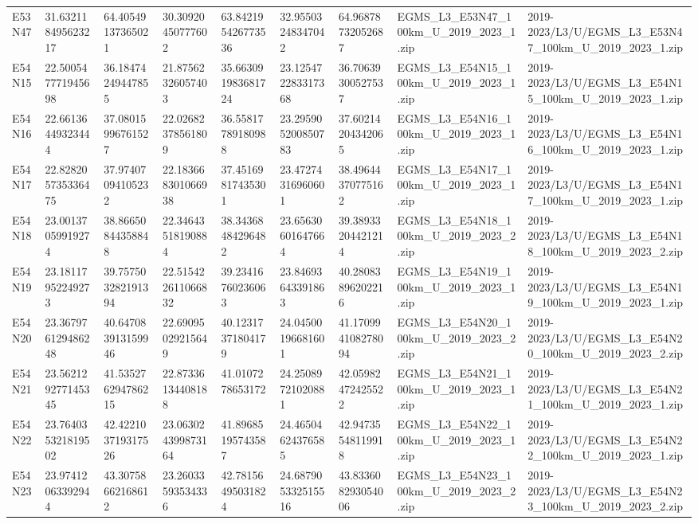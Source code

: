 \begin{landscape}
\begin{longtable}{lllllllll}
E53N47 & 31.632118495623217 & 64.40549137365021 & 30.30920450777602 & 63.842195426773536 & 32.95503248347042 & 64.96878732052687 & EGMS\_L3\_E53N47\_100km\_U\_2019\_2023\_1.zip & 2019-2023/L3/U/EGMS\_L3\_E53N47\_100km\_U\_2019\_2023\_1.zip \\
E54N15 & 22.500547771945698 & 36.18474249447855 & 21.87562326057403 & 35.663091983681724 & 23.125472283317368 & 36.70639300527537 & EGMS\_L3\_E54N15\_100km\_U\_2019\_2023\_1.zip & 2019-2023/L3/U/EGMS\_L3\_E54N15\_100km\_U\_2019\_2023\_1.zip \\
E54N16 & 22.66136449323444 & 37.08015996761527 & 22.02682378561809 & 36.55817789180988 & 23.295905200850783 & 37.60214204342065 & EGMS\_L3\_E54N16\_100km\_U\_2019\_2023\_1.zip & 2019-2023/L3/U/EGMS\_L3\_E54N16\_100km\_U\_2019\_2023\_1.zip \\
E54N17 & 22.828205735336475 & 37.97407094105232 & 22.183668301066938 & 37.45169817435301 & 23.47274316960601 & 38.49644370775162 & EGMS\_L3\_E54N17\_100km\_U\_2019\_2023\_1.zip & 2019-2023/L3/U/EGMS\_L3\_E54N17\_100km\_U\_2019\_2023\_1.zip \\
E54N18 & 23.00137059919274 & 38.86650844358848 & 22.34643518190884 & 38.34368484296482 & 23.65630601647664 & 39.38933204421214 & EGMS\_L3\_E54N18\_100km\_U\_2019\_2023\_2.zip & 2019-2023/L3/U/EGMS\_L3\_E54N18\_100km\_U\_2019\_2023\_2.zip \\
E54N19 & 23.18117952249273 & 39.757503282191394 & 22.515422611066832 & 39.23416760236063 & 23.84693643391863 & 40.28083896202216 & EGMS\_L3\_E54N19\_100km\_U\_2019\_2023\_1.zip & 2019-2023/L3/U/EGMS\_L3\_E54N19\_100km\_U\_2019\_2023\_1.zip \\
E54N20 & 23.367976129486248 & 40.647083913159946 & 22.69095029215649 & 40.12317371804179 & 24.04500196681601 & 41.170994108278094 & EGMS\_L3\_E54N20\_100km\_U\_2019\_2023\_2.zip & 2019-2023/L3/U/EGMS\_L3\_E54N20\_100km\_U\_2019\_2023\_2.zip \\
E54N21 & 23.562129277145345 & 41.535276294786215 & 22.87336134408188 & 41.0107278653172 & 24.25089721020881 & 42.05982472425522 & EGMS\_L3\_E54N21\_100km\_U\_2019\_2023\_1.zip & 2019-2023/L3/U/EGMS\_L3\_E54N21\_100km\_U\_2019\_2023\_1.zip \\
E54N22 & 23.764035321819502 & 42.422103719317526 & 23.063024399873164 & 41.89685195743587 & 24.46504624376585 & 42.94735548119918 & EGMS\_L3\_E54N22\_100km\_U\_2019\_2023\_1.zip & 2019-2023/L3/U/EGMS\_L3\_E54N22\_100km\_U\_2019\_2023\_1.zip \\
E54N23 & 23.97412063392944 & 43.30758662168612 & 23.26033593534336 & 42.78156495031824 & 24.687905332515516 & 43.833608293054006 & EGMS\_L3\_E54N23\_100km\_U\_2019\_2023\_2.zip & 2019-2023/L3/U/EGMS\_L3\_E54N23\_100km\_U\_2019\_2023\_2.zip \\

\end{longtable}
\end{landscape}

